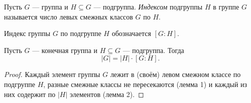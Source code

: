 \begin{definition}
    Пусть $G$ --- группа и $H \subseteq G$ --- подгруппа. \textit{Индексом} подгруппы $H$ в группе $G$ называется число левых смежных классов $G$ по $H$.
\end{definition}

Индекс группы $G$ по подгруппе $H$ обозначается $\left[G : H\right]$.

\begin{theorem} Пусть $G$ --- конечная группа и $H \subseteq G$ --- подгруппа. Тогда
    \begin{equation*}
        |G| = |H| \cdot \left[G : H\right]
    .\end{equation*}
\end{theorem}

\begin{proof}
    Каждый элемент группы $G$ лежит в (своём) левом смежном классе по подгруппе $H$, разные смежные классы не пересекаются (лемма 1) и каждый из них содержит по $|H|$ элементов (лемма 2).
\end{proof}
